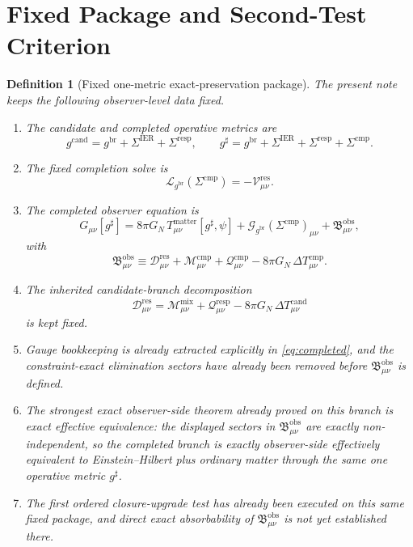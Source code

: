 \documentclass[11pt]{article}
\newcommand{\ObserverMetric}{g^{\mathrm{br}}}
\newcommand{\CandidateMetric}{g^{\mathrm{cand}}}
\newcommand{\CompletedMetric}{g^{\sharp}}
\newcommand{\BaseShift}{\Sigma^{\mathrm{IER}}}
\newcommand{\ResponseShift}{\Sigma^{\mathrm{resp}}}
\newcommand{\CompShift}{\Sigma^{\mathrm{cmp}}}
\newcommand{\ResidualCore}{\mathcal V_{\mu\nu}^{\mathrm{res}}}
\newcommand{\ResidualDec}{\mathcal D_{\mu\nu}^{\mathrm{res}}}
\newcommand{\MixQuad}{\mathcal M_{\mu\nu}^{\mathrm{mix}}}
\newcommand{\RespQuad}{\mathcal Q_{\mu\nu}^{\mathrm{resp}}}
\newcommand{\DeltaTCand}{\Delta T_{\mu\nu}^{\mathrm{cand}}}
\newcommand{\ReducedEin}{\mathcal L_{\ObserverMetric}}
\newcommand{\GaugeBook}{\mathcal G_{\ObserverMetric}}
\newcommand{\CompMix}{\mathcal M_{\mu\nu}^{\mathrm{cmp}}}
\newcommand{\CompQuad}{\mathcal Q_{\mu\nu}^{\mathrm{cmp}}}
\newcommand{\DeltaTComp}{\Delta T_{\mu\nu}^{\mathrm{cmp}}}
\newcommand{\ObsBurden}{\mathfrak B_{\mu\nu}^{\mathrm{obs}}}
\newtheorem{definition}{Definition}
\begin{document}
\section{Fixed Package and Second-Test Criterion}

\begin{definition}[Fixed one-metric exact-preservation package]
\label{def:fixed}
The present note keeps the following observer-level data fixed.
\begin{enumerate}
    \item The candidate and completed operative metrics are
    \begin{equation}
    \CandidateMetric
    =
    \ObserverMetric+\BaseShift+\ResponseShift,
    \qquad
    \CompletedMetric
    =
    \ObserverMetric+\BaseShift+\ResponseShift+\CompShift.
    \label{eq:metrics}
    \end{equation}
    \item The fixed completion solve is
    \begin{equation}
    \ReducedEin(\CompShift)=-\ResidualCore.
    \label{eq:solve}
    \end{equation}
    \item The completed observer equation is
    \begin{equation}
    G_{\mu\nu}[\CompletedMetric]
    =
    8\pi G_N\,T_{\mu\nu}^{\mathrm{matter}}[\CompletedMetric,\psi]
    +\GaugeBook(\CompShift)_{\mu\nu}
    +\ObsBurden,
    \label{eq:completed}
    \end{equation}
    with
    \begin{equation}
    \ObsBurden
    \equiv
    \ResidualDec+\CompMix+\CompQuad-8\pi G_N\,\DeltaTComp.
    \label{eq:burden}
    \end{equation}
    \item The inherited candidate-branch decomposition
    \begin{equation}
    \ResidualDec
    =
    \MixQuad+\RespQuad-8\pi G_N\,\DeltaTCand
    \label{eq:resdec}
    \end{equation}
    is kept fixed.
    \item Gauge bookkeeping is already extracted explicitly in \eqref{eq:completed}, and the constraint-exact elimination sectors have already been removed before \(\ObsBurden\) is defined.
    \item The strongest exact observer-side theorem already proved on this branch is exact effective equivalence: the displayed sectors in \(\ObsBurden\) are exactly non-independent, so the completed branch is exactly observer-side effectively equivalent to Einstein--Hilbert plus ordinary matter through the same one operative metric \(\CompletedMetric\).
    \item The first ordered closure-upgrade test has already been executed on this same fixed package, and direct exact absorbability of \(\ObsBurden\) is not yet established there.
\end{enumerate}
\end{definition}
\end{document}

